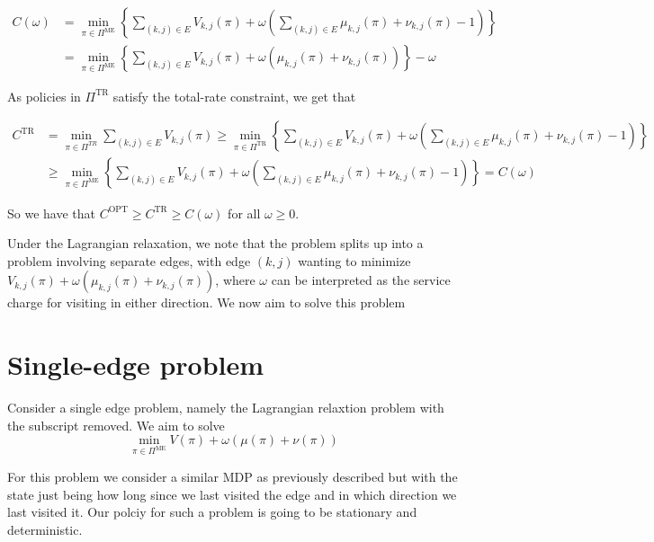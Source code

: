 \documentclass[a4paper,10pt]{article}
\theoremstyle{definition}
\theoremstyle{definition}
\theoremstyle{remark}
\theoremstyle{definition}
\begin{document}
\begin{align}
C(\omega)&=\min\limits_{\pi \in \Pi^{\text{ME}}} \left\{ \sum\limits_{(k,j) \in E} V_{k,j}(\pi) + \omega\left(\sum\limits_{(k,j) \in E} \mu_{k,j}(\pi) +\nu_{k,j}(\pi) -1 \right) \right\} \nonumber \\
&=\min\limits_{\pi \in \Pi^{\text{ME}}} \left\{ \sum\limits_{(k,j) \in E} V_{k,j}(\pi) + \omega(\mu_{k,j}(\pi) +\nu_{k,j}(\pi)) \right\}  - \omega
\end{align}

As policies in $\Pi^{\text{TR}}$ satisfy the total-rate constraint, we get that

\begin{align*}
C^{\text{TR}} &=\min\limits_{\pi \in \Pi^{TR}} \sum\limits_{(k,j) \in E} V_{k,j}(\pi) \geq \min\limits_{\pi \in \Pi^{\text{TR}}} \left\{ \sum\limits_{(k,j) \in E} V_{k,j}(\pi) + \omega\left(\sum\limits_{(k,j) \in E} \mu_{k,j}(\pi) +\nu_{k,j}(\pi) -1 \right) \right\} \\
& \geq \min\limits_{\pi \in \Pi^{\text{ME}}} \left\{ \sum\limits_{(k,j) \in E} V_{k,j}(\pi) + \omega\left(\sum\limits_{(k,j) \in E} \mu_{k,j}(\pi) +\nu_{k,j}(\pi) -1 \right) \right\} =C(\omega)
\end{align*}

So we have that $C^{\text{OPT}} \geq C^{\text{TR}} \geq C(\omega)$ for all $\omega \geq 0$. 

Under the Lagrangian relaxation, we note that the problem splits up into a problem involving separate edges, with edge $(k,j)$ wanting to minimize  $V_{k,j}(\pi)+\omega(\mu_{k,j}(\pi)+\nu_{k,j}(\pi))$, where $\omega$ can be interpreted as the service charge for visiting in either direction. We now aim to solve this problem

\section{Single-edge problem}
Consider a single edge problem, namely the Lagrangian relaxtion problem with the subscript removed. We aim to solve
\begin{equation}
\min\limits_{\pi \in \Pi^{\text{ME}}} V(\pi) + \omega(\mu(\pi)+\nu(\pi))
\end{equation}

For this problem we consider a similar MDP as previously described but with the state just being how long since we last visited the edge and in which direction we last visited it. Our polciy for such a problem is going to be stationary and deterministic.
\end{document}
